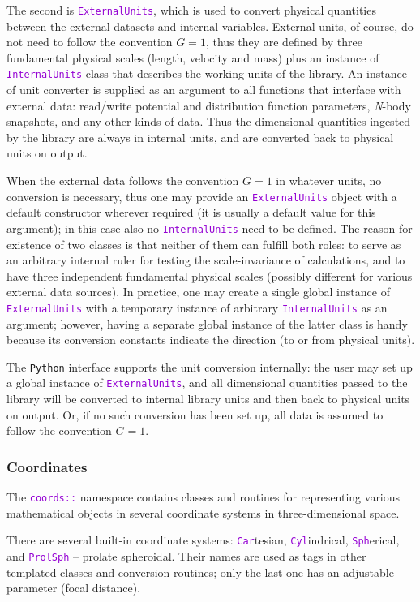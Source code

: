 \documentclass[12pt]{article}
\newcommand{\Nbody}{\textsl{N}-body\xspace}
\newcommand{\Python}{\texttt{Python}\xspace}
\newcommand{\ttt}[1]{\textcolor{darkviolet}{\texttt{#1}}}
\begin{document}
The second is \ttt{ExternalUnits}, which is used to convert physical quantities between the external datasets and internal variables. External units, of course, do not need to follow the convention $G=1$, thus they are defined by three fundamental physical scales (length, velocity and mass) plus an instance of \ttt{InternalUnits} class that describes the working units of the library. An instance of unit converter is supplied as an argument to all functions that interface with external data: read/write potential and distribution function parameters, \Nbody snapshots, and any other kinds of data. Thus the dimensional quantities ingested by the library are always in internal units, and are converted back to physical units on output.

When the external data follows the convention $G=1$ in whatever units, no conversion is necessary, thus one may provide an \ttt{ExternalUnits} object with a default constructor wherever required (it is usually a default value for this argument); in this case also no \ttt{InternalUnits} need to be defined. The reason for existence of two classes is that neither of them can fulfill both roles: to serve as an arbitrary internal ruler for testing the scale-invariance of calculations, and to have three independent fundamental physical scales (possibly different for various external data sources). In practice, one may create a single global instance of \ttt{ExternalUnits} with a temporary instance of arbitrary \ttt{InternalUnits} as an argument; however, having a separate global instance of the latter class is handy because its conversion constants indicate the direction (to or from physical units).

The \Python interface supports the unit conversion internally: the user may set up a global instance of \ttt{ExternalUnits}, and all dimensional quantities passed to the library will be converted to internal library units and then back to physical units on output. Or, if no such conversion has been set up, all data is assumed to follow the convention $G=1$.

\subsubsection{Coordinates}  \label{sec:Coords}
The \ttt{coords::} namespace contains classes and routines for representing various mathematical objects in several coordinate systems in three-dimensional space.

There are several built-in coordinate systems: \ttt{Car}tesian, \ttt{Cyl}indrical, \ttt{Sph}erical, and \ttt{ProlSph} -- prolate spheroidal. Their names are used as tags in other templated classes and conversion routines; only the last one has an adjustable parameter (focal distance).
\end{document}

